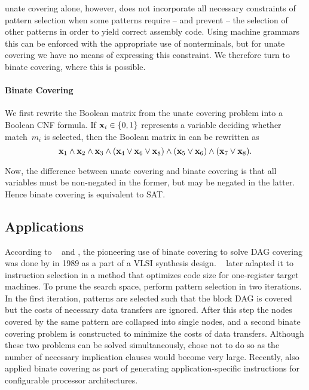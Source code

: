 \Gls{unate covering} alone, however, does not incorporate all necessary
\glspl{constraint} of \gls{pattern selection} when some \glspl{pattern} require
-- and prevent -- the selection of other \glspl{pattern} in order to yield
correct \gls{assembly code}.
%
Using \glspl{machine grammar} this can be enforced with the appropriate use of
\glspl{nonterminal}, but for \gls{unate covering} we have no means of expressing
this \gls{constraint}.
%
We therefore turn to \gls{binate covering}, where this is possible.


\paragraph{Binate Covering}

We first rewrite the Boolean matrix from the \gls{unate covering} problem into a
Boolean \gls{CNF} formula.
%
If \mbox{$\mVar{x}_i \in \mSet{0, 1}$} represents a \gls{variable} deciding
whether \gls{match}~$m_i$ is selected, then the Boolean matrix in
 can be rewritten as
%
\begin{displaymath}
  \mVar{x}_1 \mAnd \mVar{x}_2 \mAnd \mVar{x}_3 \mAnd (\mVar{x}_4 \mOr \mVar{x}_6
  \mOr \mVar{x}_8) \mAnd (\mVar{x}_5 \mOr \mVar{x}_6) \mAnd (\mVar{x}_7 \mOr
  \mVar{x}_8).
\end{displaymath}

Now, the difference between \gls{unate covering} and \gls{binate covering} is
that all \glspl{variable} must be non-negated in the former, but may be negated
in the latter.
%
Hence \gls{binate covering} is equivalent to \gls{SAT}.


\subsection{Applications}

According to \citeauthor{LiaoEtAl:1995}~\cite{LiaoEtAl:1995, LiaoEtAl:1998} and
\textcite{CongEtAl:2004}, the pioneering use of \gls{binate covering} to solve
\gls{DAG covering} was done by \textcite{Rudell:1989} in 1989 as a part of a
\gls{VLSI} synthesis design.
%
\citeauthor{LiaoEtAl:1995}~\cite{LiaoEtAl:1995, LiaoEtAl:1998} later adapted it
to \gls{instruction selection} in a method that optimizes code size for
one-\gls{register} \glspl{target machine}.
%
To prune the search space, \citeauthor{LiaoEtAl:1995} perform \gls{pattern
  selection} in two iterations.
%
In the first iteration, \glspl{pattern} are selected such that the \gls{block
  DAG} is covered but the costs of necessary data transfers are ignored.
%
After this step the \glspl{node} covered by the same \gls{pattern} are collapsed
into single \glspl{node}, and a second \gls{binate covering} problem is
constructed to minimize the costs of data transfers.
%
Although these two problems can be solved simultaneously,
\citeauthor{LiaoEtAl:1995} chose not to do so as the number of necessary
\glspl{implication clause} would become very large.
%
Recently, \textcite{CongEtAl:2004} also applied \gls{binate covering} as part of
generating application-specific \glspl{instruction} for configurable processor
architectures.

